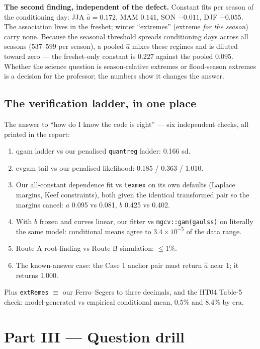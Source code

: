 \documentclass[11pt]{article}
\newcommand{\code}[1]{\texttt{#1}}
\begin{document}
\textbf{The second finding, independent of the defect.} Constant fits per
season of the conditioning day: JJA $\hat a = 0.172$, MAM $0.141$, SON
$-0.011$, DJF $-0.055$. The association lives in the freshet; winter
``extremes'' (extreme \emph{for the season}) carry none. Because the seasonal
threshold spreads conditioning days across all seasons ($537$--$599$ per
season), a pooled $\hat a$ mixes these regimes and is diluted toward zero ---
the freshet-only constant is $0.227$ against the pooled $0.095$. Whether the
science question is season-relative extremes or flood-season extremes is a
decision for the professor; the numbers show it changes the answer.

\subsection{The verification ladder, in one place}

The answer to ``how do I know the code is right'' --- six independent checks,
all printed in the report:
\begin{enumerate}
\item qgam ladder vs our penalised \code{quantreg} ladder: 0.166 sd.
\item evgam tail vs our penalised likelihood: 0.185 / 0.363 / 1.010.
\item Our all-constant dependence fit vs \code{texmex} on its own defaults
(Laplace margins, Keef constraints), both given the identical transformed
pair so the margins cancel: $a$ 0.095 vs 0.081, $b$ 0.425 vs 0.402.
\item With $b$ frozen and curves linear, our fitter vs
\code{mgcv::gam(gaulss)} on literally the same model: conditional means agree
to $3.4 \times 10^{-5}$ of the data range.
\item Route A root-finding vs Route B simulation: $\le 1\%$.
\item The known-answer case: the Case 1 anchor pair must return $\hat a$
near 1; it returns 1.000.
\end{enumerate}
Plus \code{extRemes} $\equiv$ our Ferro--Segers to three decimals, and the
HT04 Table-5 check: model-generated vs empirical conditional mean, 0.5\% and
8.4\% by era.

\section*{Part III --- Question drill}
\end{document}
